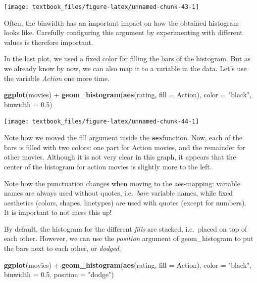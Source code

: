 \documentclass[]{tufte-book}
\newenvironment{Shaded}{}{}
\newcommand{\DataTypeTok}[1]{\textcolor[rgb]{0.56,0.13,0.00}{#1}}
\newcommand{\FloatTok}[1]{\textcolor[rgb]{0.25,0.63,0.44}{#1}}
\newcommand{\KeywordTok}[1]{\textcolor[rgb]{0.00,0.44,0.13}{\textbf{#1}}}
\newcommand{\NormalTok}[1]{#1}
\newcommand{\OperatorTok}[1]{\textcolor[rgb]{0.40,0.40,0.40}{#1}}
\newcommand{\StringTok}[1]{\textcolor[rgb]{0.25,0.44,0.63}{#1}}
\begin{document}
\texttt{[image: textbook\_files/figure-latex/unnamed-chunk-43-1]}

Often, the binwidth has an important impact on how the obtained histogram looks like. Carefully configuring this argument by experimenting with different values is therefore important.

In the last plot, we used a fixed color for filling the bars of the histogram. But as we already know by now, we can also map it to a variable in the data. Let's use the variable \emph{Action} one more time.

\begin{Shaded}
\begin{Highlighting}[]
\KeywordTok{ggplot}\NormalTok{(movies) }\OperatorTok{+}
\StringTok{    }\KeywordTok{geom_histogram}\NormalTok{(}\KeywordTok{aes}\NormalTok{(rating, }\DataTypeTok{fill =}\NormalTok{ Action), }\DataTypeTok{color =} \StringTok{"black"}\NormalTok{, }\DataTypeTok{binwidth =} \FloatTok{0.5}\NormalTok{)}
\end{Highlighting}
\end{Shaded}

\texttt{[image: textbook\_files/figure-latex/unnamed-chunk-44-1]}

Note how we moved the fill argument inside the \texttt{aes}function. Now, each of the bars is filled with two colors: one part for Action movies, and the remainder for other movies. Although it is not very clear in this graph, it appears that the center of the histogram for action movies is slightly more to the left.

Note how the punctuation changes when moving to the aes-mapping: variable names are always used without quotes, i.e.~\emph{bare} variable names, while fixed aesthetics (colors, shapes, linetypes) are used with quotes (except for numbers). It is important to not mess this up!

By default, the histogram for the different \emph{fills} are stacked, i.e.~placed on top of each other. However, we can use the \emph{position} argument of geom\_histogram to put the bars next to each other, or \emph{dodged}.

\begin{Shaded}
\begin{Highlighting}[]
\KeywordTok{ggplot}\NormalTok{(movies) }\OperatorTok{+}
\StringTok{    }\KeywordTok{geom_histogram}\NormalTok{(}\KeywordTok{aes}\NormalTok{(rating, }\DataTypeTok{fill =}\NormalTok{ Action), }
                   \DataTypeTok{color =} \StringTok{"black"}\NormalTok{, }\DataTypeTok{binwidth =} \FloatTok{0.5}\NormalTok{, }\DataTypeTok{position =} \StringTok{"dodge"}\NormalTok{)}
\end{Highlighting}
\end{Shaded}
\end{document}
